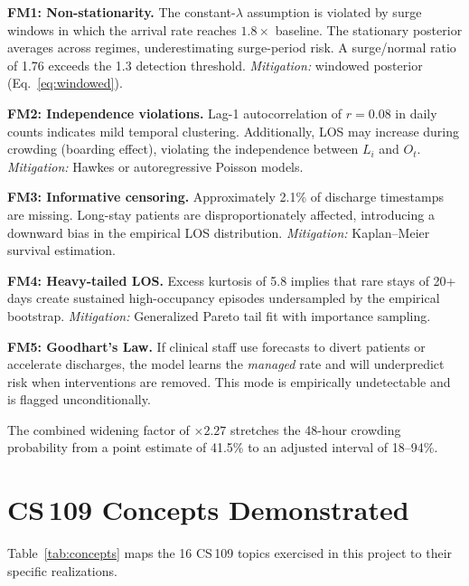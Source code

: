 \documentclass[10pt, twocolumn]{article}
\begin{document}
\noindent\textbf{FM1: Non-stationarity.}\;
The constant-$\lambda$ assumption is violated by surge windows in which the arrival rate reaches $1.8\times$ baseline. The stationary posterior averages across regimes, underestimating surge-period risk. A surge/normal ratio of 1.76 exceeds the 1.3 detection threshold. \emph{Mitigation:} windowed posterior (Eq.~\ref{eq:windowed}).

\medskip\noindent\textbf{FM2: Independence violations.}\;
Lag-1 autocorrelation of $r = 0.08$ in daily counts indicates mild temporal clustering. Additionally, LOS may increase during crowding (boarding effect), violating the independence between $L_i$ and $O_t$. \emph{Mitigation:} Hawkes or autoregressive Poisson models.

\medskip\noindent\textbf{FM3: Informative censoring.}\;
Approximately 2.1\% of discharge timestamps are missing. Long-stay patients are disproportionately affected, introducing a downward bias in the empirical LOS distribution. \emph{Mitigation:} Kaplan--Meier survival estimation.

\medskip\noindent\textbf{FM4: Heavy-tailed LOS.}\;
Excess kurtosis of 5.8 implies that rare stays of 20+ days create sustained high-occupancy episodes undersampled by the empirical bootstrap. \emph{Mitigation:} Generalized Pareto tail fit with importance sampling.

\medskip\noindent\textbf{FM5: Goodhart's Law.}\;
If clinical staff use forecasts to divert patients or accelerate discharges, the model learns the \emph{managed} rate and will underpredict risk when interventions are removed. This mode is empirically undetectable and is flagged unconditionally.

\medskip\noindent The combined widening factor of $\times 2.27$ stretches the 48-hour crowding probability from a point estimate of 41.5\% to an adjusted interval of 18--94\%.

\section{CS\,109 Concepts Demonstrated}\label{app:concepts}

Table~\ref{tab:concepts} maps the 16 CS\,109 topics exercised in this project to their specific realizations.
\end{document}
